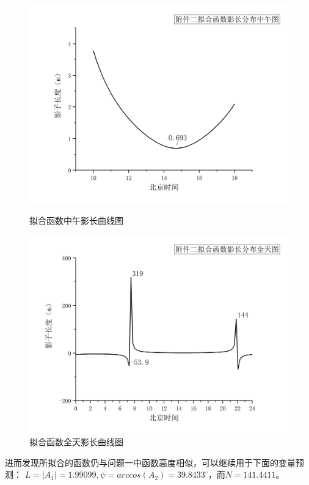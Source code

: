 \documentclass[12pt]{cumcmart}   %
\begin{document}
\begin{figure}[h]
	\centering
	\begin{minipage}{.45\textwidth}
		\centering
		\includegraphics[width=.95\textwidth]{images/yanzheng3.png}
		\caption{拟合函数中午影长曲线图}
		\label{yanzheng3}
	\end{minipage}\hfill
	\begin{minipage}{.45\textwidth}
		\centering
		\includegraphics[width=.95\textwidth]{images/yanzheng4.png}
		\caption{拟合函数全天影长曲线图}
		\label{yanzheng4}
	\end{minipage}	
\end{figure}

进而发现所拟合的函数仍与问题一中函数高度相似，可以继续用于下面的变量预测：
$L=|A_1|=1.99099,\psi=arccos(A_2)=39.8433^\circ$，而$N=141.4411$。
\end{document}
